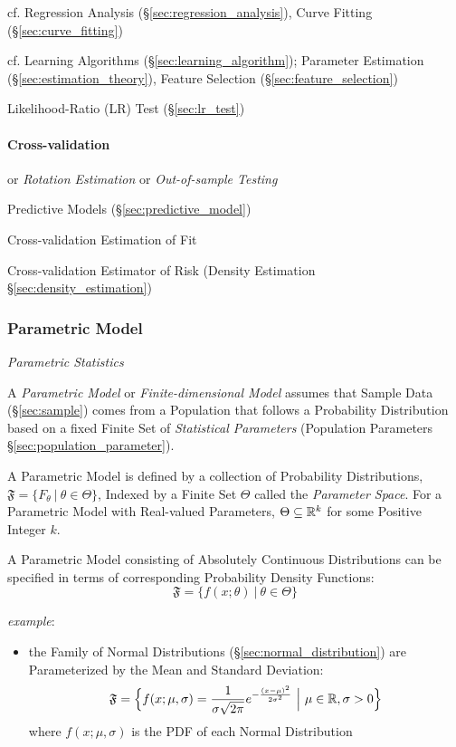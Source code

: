 cf. Regression Analysis (\S\ref{sec:regression_analysis}), Curve Fitting
(\S\ref{sec:curve_fitting})

\fist cf. Learning Algorithms (\S\ref{sec:learning_algorithm});
Parameter Estimation (\S\ref{sec:estimation_theory}), Feature Selection
(\S\ref{sec:feature_selection})

Likelihood-Ratio (LR) Test (\S\ref{sec:lr_test})



\paragraph{Cross-validation}\label{sec:cross_validation}\hfill

or \emph{Rotation Estimation} or \emph{Out-of-sample Testing}

Predictive Models (\S\ref{sec:predictive_model})

Cross-validation Estimation of Fit

Cross-validation Estimator of Risk (Density Estimation
\S\ref{sec:density_estimation})



\subsubsection{Parametric Model}\label{sec:parametric_model}

\emph{Parametric Statistics}

A \emph{Parametric Model} or \emph{Finite-dimensional Model} assumes that Sample
Data (\S\ref{sec:sample}) comes from a Population that follows a Probability
Distribution based on a fixed Finite Set of \emph{Statistical Parameters}
(Population Parameters \S\ref{sec:population_parameter}).

A Parametric Model is defined by a collection of Probability Distributions,
$\mathfrak{F} = \{ F_\theta \ |\ \theta \in \Theta \}$, Indexed by a Finite Set
$\Theta$ called the \emph{Parameter Space}. For a Parametric Model with
Real-valued Parameters, $\Theta \subseteq \mathbb{R}^k$ for some Positive Integer
$k$.

A Parametric Model consisting of Absolutely Continuous Distributions
can be specified in terms of corresponding Probability Density Functions:
\[
  \mathfrak{F} = \{ f(x; \theta) \ |\ \theta \in \Theta \}
\]

\emph{example}:
\begin{itemize}
  \item the Family of Normal Distributions (\S\ref{sec:normal_distribution}) are
    Parameterized by the Mean and Standard Deviation:
    \[
      \mathfrak{F} = \Big\{
        f(x; \mu, \sigma) =
          \frac{1}{\sigma\sqrt{2\pi}}e^{-\frac{(x-\mu)^2}{2\sigma^2}}
        \ \Big|\ \mu \in \mathbb{R}, \sigma > 0
      \Big\}
    \]
    where $f(x; \mu, \sigma)$ is the PDF of each Normal Distribution
\end{itemize}

